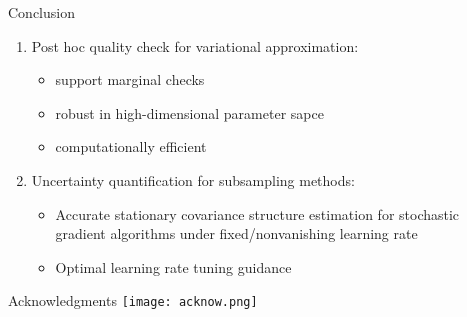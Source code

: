\documentclass[10pt,xcolor=table]{beamer}
\begin{document}
\begin{frame}{Conclusion}
	
\begin{enumerate}
	\item Post hoc quality check for variational approximation:
	\begin{itemize}
		\item support marginal checks
		\item robust in high-dimensional parameter sapce
		\item computationally efficient
	\end{itemize}
	\item Uncertainty quantification for subsampling methods: 
	\begin{itemize}
		\item Accurate stationary covariance structure estimation for stochastic gradient algorithms under fixed/nonvanishing learning rate
		\item Optimal learning rate tuning guidance 
	\end{itemize}
\end{enumerate}
	
\end{frame}


\begin{frame}{\Large Acknowledgments}
	\texttt{[image: acknow.png]} 
\end{frame}
\end{document}
